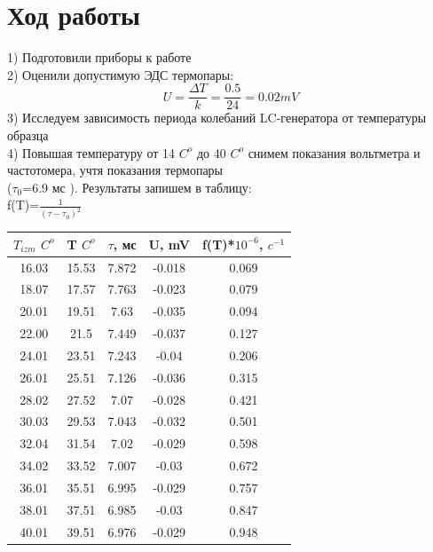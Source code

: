 \documentclass[a4paper,12pt]{article} %
\begin{document}
\section{Ход работы}
1) Подготовили приборы к работе \\
2) Оценили допустимую ЭДС термопары:\\
\begin{equation}
 U=\frac{\Delta T}{k} = \frac{0.5}{24}=0.02 mV
\end{equation}
3) Исследуем зависимость периода колебаний LC-генератора от температуры образца\\
4) Повышая температуру от 14 $C^{o}$ до 40 $C^{o}$ снимем показания вольтметра и частотомера, учтя показания термопары \\($\tau_0$=6.9 мс ). Результаты запишем в таблицу: \\
f(T)=$\frac{1}{(\tau-\tau_0)^{2}}$ \\
\begin{tabular}{|c|c|c|c|c|}
\hline 
$T_{izm}$ $C^{o}$ & T $C^{o}$ & $\tau$, мс & U, mV & f(T)*$10^{-6}$, $c^{-1}$ \\ 
\hline 
16.03 & 15.53 & 7.872 & -0.018 & 0.069 \\ 
\hline 
18.07 & 17.57 & 7.763 & -0.023 & 0.079 \\ 
\hline 
20.01 & 19.51 & 7.63 & -0.035 & 0.094 \\ 
\hline 
22.00 & 21.5 & 7.449 & -0.037 & 0.127 \\ 
\hline 
24.01 & 23.51 & 7.243 & -0.04 & 0.206 \\ 
\hline 
26.01 & 25.51 & 7.126 & -0.036 & 0.315 \\ 
\hline 
28.02 & 27.52 & 7.07 & -0.028 & 0.421 \\ 
\hline 
30.03 & 29.53 & 7.043 & -0.032 & 0.501 \\ 
\hline 
32.04 & 31.54 & 7.02 & -0.029 & 0.598 \\ 
\hline 
34.02 & 33.52 & 7.007 & -0.03 & 0.672 \\ 
\hline 
36.01 & 35.51 & 6.995 & -0.029 & 0.757 \\ 
\hline 
38.01 & 37.51 & 6.985 & -0.03 & 0.847 \\ 
\hline 
40.01 & 39.51 & 6.976 & -0.029 & 0.948 \\ 
\hline 
\end{tabular} 
\end{document}
